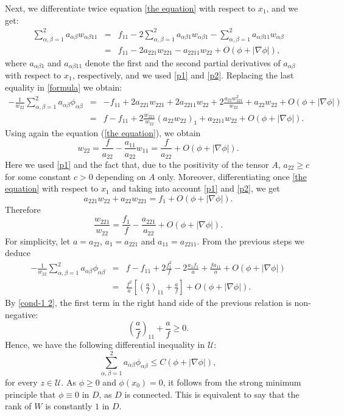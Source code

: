 \documentclass[12pt]{amsart}
\newcommand{\1}{\mathbf 1}
\begin{document}
Next, we differentiate twice equation \eqref{the equation} with respect to $x_1$, and we get:
\begin{eqnarray*}
\sum_{\alpha,\beta=1}^2a_{\alpha\beta}w_{\alpha\beta11}&=&f_{11}-2\sum_{\alpha,\beta=1}^2a_{\alpha\beta1}w_{\alpha\beta1}-\sum_{\alpha,\beta=1}^2a_{\alpha\beta11}w_{\alpha\beta}\\
&=&f_{11}-2a_{221}w_{221}-a_{2211}w_{22}+O(\phi+|\nabla \phi|),
\end{eqnarray*}
where $a_{\alpha\beta1}$ and $a_{\alpha\beta11}$ denote the first and the second partial derivatives of $a_{\alpha\beta}$ with respect to $x_1$, respectively, and we used \eqref{p1} and \eqref{p2}. Replacing the last equality in \eqref{formula}  we obtain:
\begin{eqnarray*}
-\frac1{w_{22}}\sum_{\alpha,\beta=1}^2a_{\alpha\beta}\phi_{\alpha\beta}&=&-f_{11}+2a_{221}w_{221}+2a_{2211}w_{22}+2\frac{a_{22}w_{221}^2}{w_{22}}+a_{22}w_{22}+O(\phi+|\nabla \phi|)\\
&=&f-f_{11}+2\frac{w_{221}}{w_{22}}(a_{22}w_{22})_1+a_{2211}w_{22}+O(\phi+|\nabla \phi|).
\end{eqnarray*}
Using again the equation (\ref{the equation}), we obtain
$$
w_{22}=\frac{f}{a_{22}}-\frac{a_{11}}{a_{22}}w_{11}=
\frac{f}{a_{22}}+O(\phi+|\nabla \phi|).
$$
Here we used \eqref{p1} and the fact that, due to the positivity of the tensor $A$, $a_{22}\ge c$ for some constant $c>0$ depending on $A$ only. Moreover, differentiating once \eqref{the equation} with respect to $x_1$ and taking into account \eqref{p1} and \eqref{p2}, we get
$$
a_{221}w_{22}+a_{22}w_{221}= f_1 +O(\phi+|\nabla \phi|).
$$
Therefore
$$
\frac{w_{221}}{w_{22}}=\frac{f_1}{f}-\frac{a_{221}}{a_{22}}+O(\phi+|\nabla \phi|).
$$
For simplicity, let $a=a_{22}$, $a_1=a_{221}$ and $a_{11}=a_{2211}$. From the previous steps we deduce
\begin{eqnarray*}
-\frac1{w_{22}}\sum_{\alpha,\beta=1}^2a_{\alpha\beta}\phi_{\alpha\beta}&
=&f-f_{11}+2\frac{f_1^2}{f}-2\frac{a_1f_1}{a}+\frac{fa_{11}}{a}+O(\phi+|\nabla \phi|)\\
&=&\frac{f^2}{a}\left[\left(\frac{a}{f}\right)_{11}+\frac af\right]+O(\phi+|\nabla \phi|).
\end{eqnarray*}
By \eqref{cond-1 2}, the first term in the right hand side of the previous relation is non-negative: 
\begin{equation}\label{added 1}
\left(\frac{a}{f}\right)_{11}+\frac af\ge0.
\end{equation}
Hence, we have the following differential inequality in $\mathcal U$:
\[
\sum_{\alpha,\beta=1}^2a_{\alpha\beta}\phi_{\alpha\beta}\le C (\phi+|\nabla \phi|),
\]
for every $z\in{\mathcal U}$. As $\phi\ge0$ and $\phi(x_0)=0$, it follows from the strong minimum principle that $\phi\equiv0$ in $D$, as $D$ is connected. This is equivalent to say that the rank of $W$ is constantly $1$ in $D$.
\end{document}
